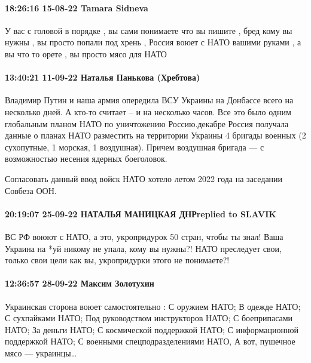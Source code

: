  
 
 
 
 

\paragraph{18:26:16 15-08-22 Tamara Sidneva}

У вас с головой в порядке , вы сами понимаете что вы пишите , бред кому вы
нужны , вы просто попали под хрень , Россия воюет с НАТО вашими руками , а вы
что то орете , вы просто мясо для НАТО

\paragraph{13:40:21 11-09-22 Наталья Панькова (Хребтова)}

Владимир Путин и наша армия опередила ВСУ Украины на Донбассе всего на
несколько дней. А кто-то считает – и на несколько часов. Все это было одним
глобальным планом НАТО по уничтожению Россию.декабре Россия получала данные о
планах НАТО разместить на территории Украины 4 бригады военных (2 сухопутные, 1
морская, 1 воздушная). Причем воздушная бригада — с возможностью несения
ядерных боеголовок.

Согласовать данный ввод войск НАТО хотело летом 2022 года на заседании Совбеза
ООН.

\paragraph{20:19:07 25-09-22 НАТАЛЬЯ МАНИЦКАЯ ДНРreplied to SLAVIK}

ВС РФ воюют с НАТО, а это, укропридурок 50 стран, чтобы ты знал! Ваша Украина
на *уй никому не упала, кому вы нужны?! НАТО преследует свои, только свои цели
как вы, укропридурки этого не понимаете?!

\paragraph{12:36:57 28-09-22 Максим Золотухин}

Украинская сторона воюет самостоятельно :
С оружием НАТО;
В одежде НАТО;
С сухпайками НАТО;
Под руководством инструкторов НАТО;
С боеприпасами НАТО;
За деньги НАТО;
С космической поддержкой НАТО;
С информационной поддержкой НАТО;
С военными спецподразделениями НАТО,
А вот, пушечное мясо — украинцы…

